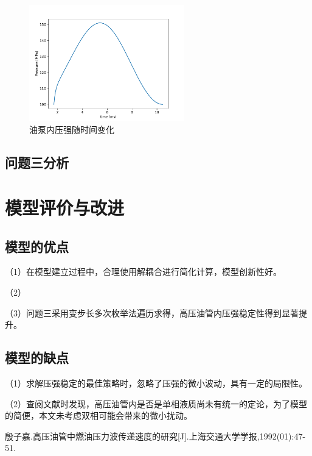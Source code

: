 \documentclass{cumcmthesis}
\begin{document}
\begin{figure}[htbp]
    \centering
    \includegraphics[width=0.6\textwidth]{bin_omega_0_3.pdf} 
    \caption{油泵内压强随时间变化}
    \label{bin}
\end{figure}


\subsection{问题三分析}

\section{模型评价与改进}
\subsection{模型的优点}
（1）在模型建立过程中，合理使用解耦合进行简化计算，模型创新性好。

（2）

（3）问题三采用变步长多次枚举法遍历求得，高压油管内压强稳定性得到显著提升。
\subsection{模型的缺点}
（1）求解压强稳定的最佳策略时，忽略了压强的微小波动，具有一定的局限性。

（2）查阅文献时发现，高压油管内是否是单相液质尚未有统一的定论，为了模型的简便，本文未考虑双相可能会带来的微小扰动。


\newpage
\begin{thebibliography}{9}%
  殷子嘉.高压油管中燃油压力波传递速度的研究[J].上海交通大学学报,1992(01):47-51.
\end{thebibliography}
\end{document}
